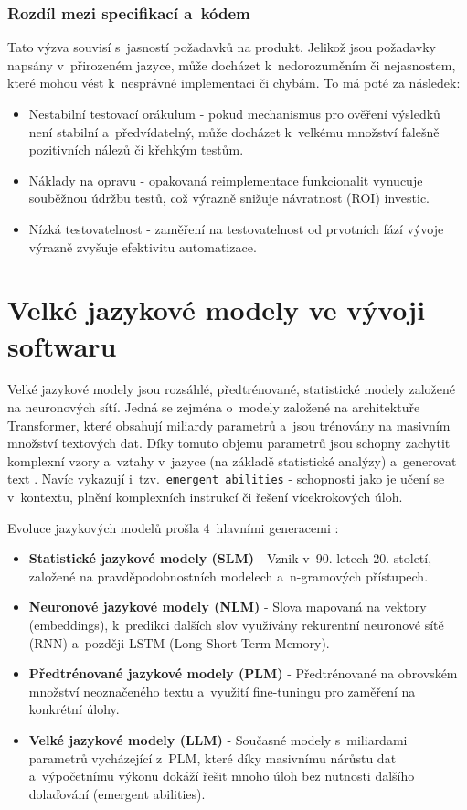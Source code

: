 \documentclass[czech, ing, kiv, he, iso690numb, viewonly]{fasthesis}
\begin{document}
\subsubsection*{Rozdíl mezi specifikací a~kódem}
Tato výzva souvisí s~jasností požadavků na produkt. Jelikož jsou požadavky napsány v~přirozeném jazyce, může docházet k~nedorozuměním či nejasnostem,
které mohou vést k~nesprávné implementaci či chybám. To má poté za následek:

\begin{itemize}
    \item Nestabilní testovací orákulum - pokud mechanismus pro ověření výsledků není stabilní a~předvídatelný, může docházet k~velkému množství falešně pozitivních nálezů či křehkým testům.
    \item Náklady na opravu - opakovaná reimplementace funkcionalit vynucuje souběžnou údržbu testů, což výrazně snižuje návratnost (ROI) investic.
    \item Nízká testovatelnost - zaměření na testovatelnost od prvotních fází vývoje výrazně zvyšuje efektivitu automatizace.
\end{itemize}

\section{Velké jazykové modely ve vývoji softwaru}
Velké jazykové modely jsou rozsáhlé, předtrénované, statistické modely založené na neuronových sítí. 
Jedná se zejména o~modely založené na architektuře Transformer, které obsahují miliardy parametrů a~jsou trénovány na masivním množství 
textových dat. Díky tomuto objemu parametrů jsou schopny zachytit komplexní vzory a~vztahy v~jazyce (na základě statistické analýzy) a~generovat 
text  \cite{minaee2024large}. Navíc vykazují i~tzv.~\texttt{emergent abilities} - schopnosti jako je učení se v~kontextu, plnění komplexních 
instrukcí či řešení vícekrokových úloh.

Evoluce jazykových modelů prošla 4~hlavními generacemi \cite{wang2025history}:

\begin{itemize}
    \item \textbf{Statistické jazykové modely (SLM)} - Vznik v~90. letech 20. století, založené na pravděpodobnostních modelech a~n-gramových přístupech.
    \item \textbf{Neuronové jazykové modely (NLM)} - Slova mapovaná na vektory (embeddings), k~predikci dalších slov využívány rekurentní neuronové sítě (RNN) a~později LSTM (Long Short-Term Memory).
    \item \textbf{Předtrénované jazykové modely (PLM)} - Předtrénované na obrovském množství neoznačeného textu a~využití fine-tuningu pro zaměření na konkrétní úlohy.
    \item \textbf{Velké jazykové modely (LLM)} - Současné modely s~miliardami parametrů vycházející z~PLM, které díky masivnímu nárůstu dat a~výpočetnímu výkonu dokáží řešit mnoho úloh bez nutnosti dalšího dolaďování (emergent abilities).
\end{itemize}
\end{document}
